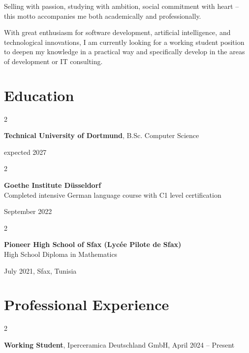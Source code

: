 \documentclass[10pt, letterpaper]{article}
\newenvironment{twocolentry}[2][]{
    \onecolentry
    \def\secondColumn{#2}
    \setcolumnwidth{\fill, 4.5 cm}
    \begin{paracol}{2}
}{
    \switchcolumn \raggedleft \secondColumn
    \end{paracol}
    \endonecolentry
} %
\begin{document}
Selling with passion, studying with ambition, social commitment with heart – this motto accompanies me both academically and professionally.

With great enthusiasm for software development, artificial intelligence, and technological innovations, I am currently looking for a working student position to deepen my knowledge in a practical way and specifically develop in the areas of development or IT consulting.




    
    
\section{Education}

\begin{twocolentry}{
      expected 2027
}
    \textbf{Technical University of Dortmund}, B.Sc. Computer Science

    \vspace{0.10 cm}
   
        
       \end{twocolentry}
             
             
\vspace{0.2 cm}
\begin{twocolentry}{
    September 2022
}
    \textbf{Goethe Institute Düsseldorf} \\
   Completed intensive German language course with C1 level certification 
\end{twocolentry}
\vspace{0.2cm}

\begin{twocolentry}{
    July 2021, Sfax, Tunisia}

    \textbf{Pioneer High School of Sfax (Lycée Pilote de Sfax)}\\

   
     
             High School Diploma in Mathematics 


\end{twocolentry}



    
    \section{Professional Experience}



        
        \begin{twocolentry}{
            April 2024 – Present 
        }
            \textbf{Working Student}, Iperceramica Deutschland GmbH, \end{twocolentry}
\end{document}
